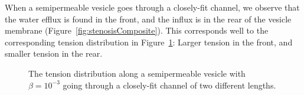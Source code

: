 \documentclass[prb,preprint,showpacs,preprintnumbers,amsmath,amssymb,longbibliography]{revtex4-1}
\begin{document}
When a semipermeable vesicle goes through a closely-fit channel, we observe that the water efflux is found in the front, and the influx is in the rear of the vesicle membrane (Figure~\ref{fig:stenosisComposite}). This corresponds well to the corresponding tension distribution in Figure~\ref{fig:stenosisTensions}: Larger tension in the front, and smaller tension in the rear.
\begin{figure}[htp]
  \centering
  \caption{\label{fig:stenosisTensions} The tension distribution along a
  semipermeable vesicle with $\beta = 10^{-3}$ going through a
  closely-fit channel of two different lengths.}
\end{figure}

\end{document}
